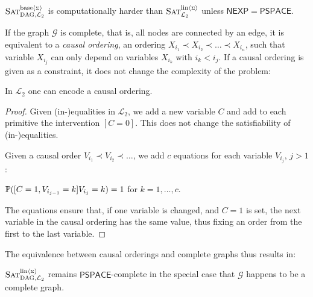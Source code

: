 \documentclass[a4paper,UKenglish,cleveref, autoref, thm-restate]{lipics-v2021}
\newcommand{\compactEquals}[1]{\let\IsInPP=1#1\let\IsInPP=\relax}
\newcommand{\PP}[1]{\mathbb{P}(\compactEquals{#1})}
\newcommand{\NEXP}{\ensuremath{\mathsf{NEXP}}}
\newcommand{\PSPACE}{\ensuremath{\mathsf{PSPACE}}}
\newcommand{\cL}{{\mathcal L}}
\def\probsumname#1#2{^{\text{#1}{\langle{\scriptscriptstyle\Sigma}\rangle}}_{\text{#2}}}
\def\probsumgraphname#1#2{^{\text{#1}{\langle{\scriptscriptstyle\Sigma}\rangle}}_{\mbox{\scriptsize\sc DAG}, \text{#2}}}
\newcommand{\SATinterventcompsumgraph}{\mbox{\sc Sat}\probsumgraphname{base}{${\cal L}_2$}}
\newcommand{\SATinterventlinsumgraph}{\mbox{\sc Sat}\probsumgraphname{lin}{${\cal L}_2$}}
\newcommand{\SATinterventlinsum}{\mbox{\sc Sat}\probsumname{lin}{${\cal L}_2$}}
\begin{document}
\begin{corollary}	
	$\SATinterventcompsumgraph$ is computationally harder than  $\SATinterventlinsum$ unless 
	$\NEXP = \PSPACE$.	
\end{corollary}


If the graph $\mathcal{G}$ is complete, that is, all nodes are connected by an edge, 
it is equivalent to a \emph{causal ordering}, an ordering $X_{i_1} \prec X_{i_2} \prec \ldots \prec X_{i_n}$, such that variable $X_{i_j}$ can only depend on variables $X_{i_k}$ with $i_k < i_j$.
If a causal ordering is given as a constraint, it does not change the complexity of the problem:

\begin{lemma}\label{lemm:causal:ordering}
    In $\cL_2$ one can encode a causal ordering.
\end{lemma}
\begin{proof}Given (in-)equalities in $\cL_2$, we add a new variable $C$ and add to each primitive the intervention $[C=0]$. 
This does not change the satisfiability of (in-)equalities.

Given a causal order $V_{i_1} \prec V_{i_2} \prec \ldots$, 
we add $c$ equations for each variable $V_{i_j}$, $j > 1$:

$\PP{[C=1, V_{i_{j-1}}=k] V_{i_{j}} = k} = 1$ for $k=1,\ldots,c$.

The equations ensure that, if one variable is changed, and $C=1$ is set, the next variable in the causal ordering has the same value, thus fixing an order from the first to the last variable.
\end{proof}

The equivalence between causal orderings and complete graphs thus results in:
\begin{corollary}
$\SATinterventlinsumgraph$ remains  $\PSPACE$-complete in the special case that  $\mathcal{G}$ happens to be a complete graph. 
\end{corollary}
\end{document}
